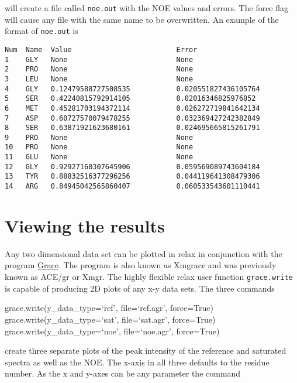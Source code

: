 
will create a file called \texttt{noe.out} with the NOE values and errors.  The force flag will cause any file with the same name to be overwritten.  An example of the format of \texttt{noe.out} is

{\footnotesize \begin{verbatim}
Num  Name  Value                         Error
1    GLY   None                          None
2    PRO   None                          None
3    LEU   None                          None
4    GLY   0.12479588727508535           0.020551827436105764
5    SER   0.42240815792914105           0.02016346825976852
6    MET   0.45281703194372114           0.026272719841642134
7    ASP   0.60727570079478255           0.032369427242382849
8    SER   0.63871921623680161           0.024695665815261791
9    PRO   None                          None
10   PRO   None                          None
11   GLU   None                          None
12   GLY   0.92927160307645906           0.059569089743604184
13   TYR   0.88832516377296256           0.044119641308479306
14   ARG   0.84945042565860407           0.060533543601110441
\end{verbatim}}




\section{Viewing the results}

Any two dimensional data set can be plotted in relax in conjunction with the program \href{http://plasma-gate.weizmann.ac.il/Grace/}{Grace}.  The program is also known as Xmgrace and was previously known as ACE/gr or Xmgr.  The highly flexible relax user function \texttt{grace.write} is capable of producing 2D plots of any x-y data sets.  The three commands

\begin{exampleenv}
grace.write(y\_data\_type=`ref', file=`ref.agr', force=True) \\
grace.write(y\_data\_type=`sat', file=`sat.agr', force=True) \\
grace.write(y\_data\_type=`noe', file=`noe.agr', force=True)
\end{exampleenv}

create three separate plots of the peak intensity of the reference and saturated spectra as well as the NOE.  The x-axis in all three defaults to the residue number.  As the x and y-axes can be any parameter the command

